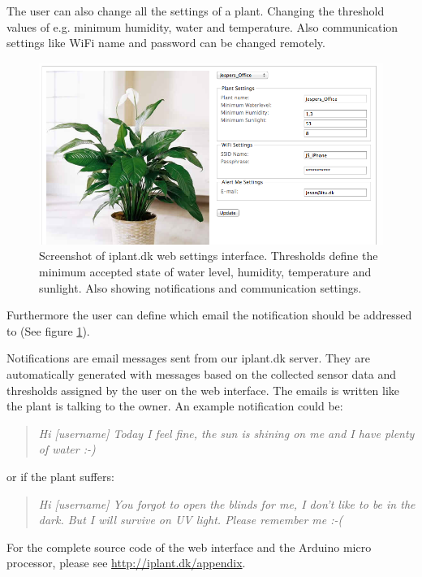 \documentclass{ubicomp2012}
\begin{document}
The user can also change all the settings of a plant. Changing the threshold values of e.g. minimum humidity, water and temperature. Also communication settings like WiFi name and password can be changed remotely.

\begin{figure}[h!]
\centering
\includegraphics[width=\columnwidth]{web_settings.png}
\caption{Screenshot of iplant.dk web settings interface. Thresholds define the minimum accepted state of water level, humidity, temperature and sunlight. Also showing notifications and communication settings.}
\label{fig:web_settings}
\end{figure}

Furthermore the user can define which email the notification should be addressed to (See figure \ref{fig:web_settings}).

Notifications are email messages sent from our iplant.dk server. They are automatically generated with messages based on the collected sensor data and thresholds assigned by the user on the web interface. The emails is written like the plant is talking to the owner.
An example notification could be: 
\begin{quotation}
\emph{Hi [username]
Today I feel fine, the sun is shining on me and I have plenty of water :-) }
\end{quotation}
or if the plant suffers:
\begin{quotation}
\emph{Hi [username]
You forgot to open the blinds for me, I don't like to be in the dark. But I will survive on UV light. Please remember me :-( }
\end{quotation}

For the complete source code of the web interface and the Arduino micro processor, please see \url{http://iplant.dk/appendix}.
\end{document}
